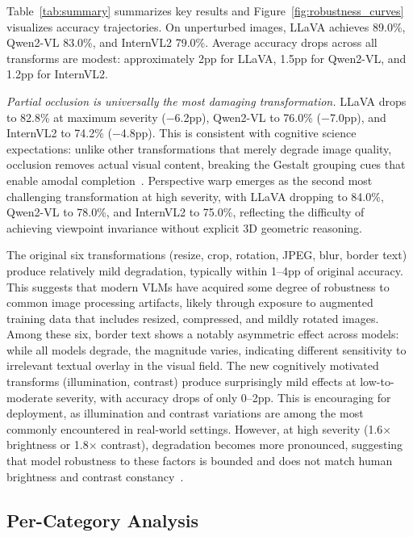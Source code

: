 \documentclass{cvpr}
\begin{document}
Table~\ref{tab:summary} summarizes key results and Figure~\ref{fig:robustness_curves} visualizes accuracy trajectories. On unperturbed images, LLaVA achieves 89.0\%, Qwen2-VL 83.0\%, and InternVL2 79.0\%. Average accuracy drops across all transforms are modest: approximately 2pp for LLaVA, 1.5pp for Qwen2-VL, and 1.2pp for InternVL2.

\textit{Partial occlusion is universally the most damaging transformation.} LLaVA drops to 82.8\% at maximum severity ($-$6.2pp), Qwen2-VL to 76.0\% ($-$7.0pp), and InternVL2 to 74.2\% ($-$4.8pp). This is consistent with cognitive science expectations: unlike other transformations that merely degrade image quality, occlusion removes actual visual content, breaking the Gestalt grouping cues that enable amodal completion~\cite{kanizsa1979organization}. Perspective warp emerges as the second most challenging transformation at high severity, with LLaVA dropping to 84.0\%, Qwen2-VL to 78.0\%, and InternVL2 to 75.0\%, reflecting the difficulty of achieving viewpoint invariance without explicit 3D geometric reasoning.

The original six transformations (resize, crop, rotation, JPEG, blur, border text) produce relatively mild degradation, typically within 1--4pp of original accuracy. This suggests that modern VLMs have acquired some degree of robustness to common image processing artifacts, likely through exposure to augmented training data that includes resized, compressed, and mildly rotated images. Among these six, border text shows a notably asymmetric effect across models: while all models degrade, the magnitude varies, indicating different sensitivity to irrelevant textual overlay in the visual field. The new cognitively motivated transforms (illumination, contrast) produce surprisingly mild effects at low-to-moderate severity, with accuracy drops of only 0--2pp. This is encouraging for deployment, as illumination and contrast variations are among the most commonly encountered in real-world settings. However, at high severity (1.6$\times$ brightness or 1.8$\times$ contrast), degradation becomes more pronounced, suggesting that model robustness to these factors is bounded and does not match human brightness and contrast constancy~\cite{walsh2014perceptual}.

\subsection{Per-Category Analysis}
\label{sec:category}
\end{document}
